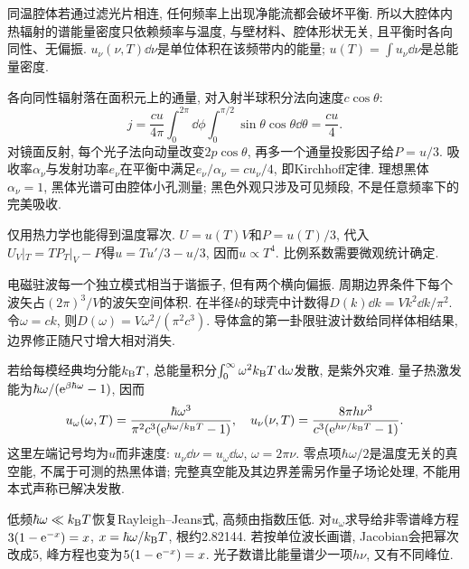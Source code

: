 \label{ch:radiation}
同温腔体若通过滤光片相连, 任何频率上出现净能流都会破坏平衡. 所以大腔体内热辐射的谱能量密度只依赖频率与温度, 与壁材料、腔体形状无关, 且平衡时各向同性、无偏振. $u_\nu(\nu,T)\dd\nu$是单位体积在该频带内的能量; $u(T)=\int u_\nu\dd\nu$是总能量密度.

各向同性辐射落在面积元上的通量, 对入射半球积分法向速度$c\cos\theta$:
\[
j=\frac{cu}{4\pi}\int_0^{2\pi}\dd\phi\int_0^{\pi/2}\sin\theta\cos\theta\dd\theta=\frac{cu}{4}.
\]
对镜面反射, 每个光子法向动量改变$2p\cos\theta$, 再多一个通量投影因子给$P=u/3$. 吸收率$\alpha_\nu$与发射功率$e_\nu$在平衡中满足$e_\nu/\alpha_\nu=cu_\nu/4$, 即Kirchhoff定律. 理想黑体$\alpha_\nu=1$, 黑体光谱可由腔体小孔测量; 黑色外观只涉及可见频段, 不是任意频率下的完美吸收.

仅用热力学也能得到温度幂次. $U=u(T)V$和$P=u(T)/3$, 代入$U_V|_T=T P_T|_V-P$得$u=Tu'/3-u/3$, 因而$u\propto T^4$. 比例系数需要微观统计确定.

电磁驻波每一个独立模式相当于谐振子, 但有两个横向偏振. 周期边界条件下每个波矢占$(2\pi)^3/V$的波矢空间体积. 在半径$k$的球壳中计数得$D(k)\dd k=Vk^2\dd k/\pi^2$. 令$\omega=ck$, 则$D(\omega)=V\omega^2/(\pi^2c^3)$. 导体盒的第一卦限驻波计数给同样体相结果, 边界修正随尺寸增大相对消失.

若给每模经典均分能$k_{\mathrm B} T$, 总能量积分$\int_0^\infty\omega^2k_{\mathrm B} T\,\mathrm d\omega$发散, 是紫外灾难. 量子热激发能为$\hbar\omega/(\mathrm e^{\beta\hbar\omega}-1)$, 因而
\[
u_\omega(\omega,T)=\frac{\hbar\omega^3}{\pi^2c^3(\mathrm e^{\hbar\omega/k_{\mathrm B} T}-1)},\quad
u_\nu(\nu,T)=\frac{8\pi h\nu^3}{c^3(\mathrm e^{h\nu/k_{\mathrm B} T}-1)}.
\]
这里左端记号均为$u$而非速度: $u_\nu\dd\nu=u_\omega\dd\omega$, $\omega=2\pi\nu$. 零点项$\hbar\omega/2$是温度无关的真空能, 不属于可测的热黑体谱; 完整真空能及其边界差需另作量子场论处理, 不能用本式声称已解决发散.

低频$\hbar\omega\ll k_{\mathrm B} T$恢复Rayleigh--Jeans式, 高频由指数压低. 对$u_\omega$求导给非零谱峰方程$3(1-\mathrm e^{-x})=x$, $x=\hbar\omega/k_{\mathrm B} T$, 根约2.82144. 若按单位波长画谱, Jacobian会把幂次改成5, 峰方程也变为$5(1-\mathrm e^{-x})=x$. 光子数谱比能量谱少一项$h\nu$, 又有不同峰位.

